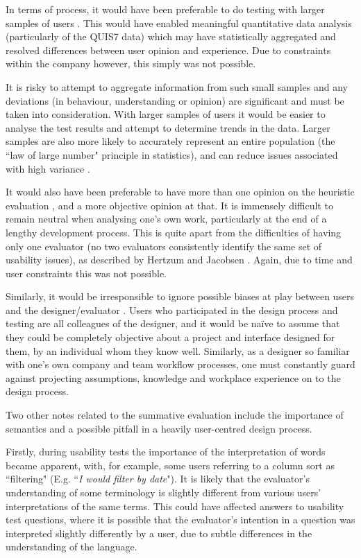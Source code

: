 In terms of process, it would have been preferable to do testing with larger samples of users \citep{Faulkner}. This would have enabled meaningful quantitative data analysis (particularly of the QUIS7 data) which may have statistically aggregated and resolved differences between user opinion and experience. Due to constraints within the company however, this simply was not possible. 

It is risky to attempt to aggregate information from such small samples \citep{Dicks} and any deviations (in behaviour, understanding or opinion) are significant and must be taken into consideration. With larger samples of users it would be easier to analyse the test results and attempt to determine trends in the data. Larger samples are also more likely to accurately represent an entire population (the ``law of large number" principle in statistics), and can reduce issues associated with high variance \citep[p. 132 \& 235]{Gravetter}. 

It would also have been preferable to have more than one opinion on the heuristic evaluation \citep{NielsenHow}, and a more objective opinion at that. It is immensely difficult to remain neutral when analysing one's own work, particularly at the end of a lengthy development process. This is quite apart from the difficulties of having only one evaluator (no two evaluators consistently identify the same set of usability issues), as described by Hertzum and Jacobsen \citep{Hertzum}. Again, due to time and user constraints this was not possible. 

Similarly, it would be irresponsible to ignore possible biases at play between users and the designer/evaluator \citep{Dumas}. Users who participated in the design process and testing are all colleagues of the designer, and it would be na\"{i}ve to assume that they could be completely objective about a project and interface designed for them, by an individual whom they know well. Similarly, as a designer so familiar with one's own company and team workflow processes, one must constantly guard against projecting assumptions, knowledge and workplace experience on to the design process.

Two other notes related to the summative evaluation include the importance of semantics and a possible pitfall in a heavily user-centred design process. 

Firstly, during usability tests the importance of the interpretation of words became apparent, with, for example, some users referring to a column sort as ``filtering" (E.g. ``\textit{I would filter by date}"). It is likely that the evaluator's understanding of some terminology is slightly different from various users' interpretations of the same terms. This could have affected answers to usability test questions, where it is possible that the evaluator's intention in a question was interpreted slightly differently by a user, due to subtle differences in the understanding of the language. 

